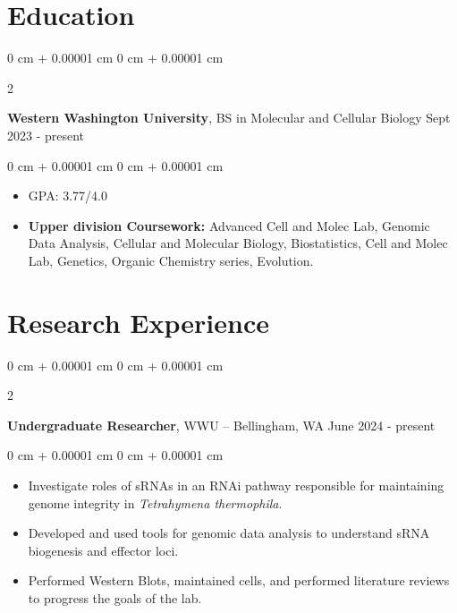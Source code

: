 \documentclass[10pt, letterpaper]{article}
\newenvironment{highlights}{
    \begin{itemize}[
        topsep=0.10 cm,
        parsep=0.10 cm,
        partopsep=0pt,
        itemsep=0pt,
        leftmargin=0 cm + 10pt
    ]
}{
    \end{itemize}
} %
\newenvironment{onecolentry}{
    \begin{adjustwidth}{
        0 cm + 0.00001 cm
    }{
        0 cm + 0.00001 cm
    }
}{
    \end{adjustwidth}
} %
\newenvironment{twocolentry}[2][]{
    \onecolentry
    \def\secondColumn{#2}
    \setcolumnwidth{\fill, 4.5 cm}
    \begin{paracol}{2}
}{
    \switchcolumn \raggedleft \secondColumn
    \end{paracol}
    \endonecolentry
} %
\begin{document}
    \section{Education}




        \begin{twocolentry}{
            Sept 2023 - present
        }
            \textbf{Western Washington University}, BS in Molecular and Cellular Biology \end{twocolentry}

        \vspace{0.10 cm}
        \begin{onecolentry}
            \begin{highlights}
                \item GPA: 3.77/4.0 %
                \item \textbf{Upper division Coursework:} Advanced Cell and Molec Lab, Genomic Data Analysis, Cellular and Molecular Biology, Biostatistics, Cell and Molec Lab, Genetics, Organic Chemistry series, Evolution.
            \end{highlights}
        \end{onecolentry}




    \section{Research Experience}




        \begin{twocolentry}{
            June 2024 - present
        }
            \textbf{Undergraduate Researcher}, WWU -- Bellingham, WA\end{twocolentry}

        \vspace{0.10 cm}
        \begin{onecolentry}
            \begin{highlights}
            \item Investigate roles of sRNAs in an RNAi pathway responsible for maintaining genome integrity in \textit{Tetrahymena thermophila}.
                \item Developed and used tools for genomic data analysis to understand sRNA biogenesis and effector loci.
                \item Performed Western Blots, maintained cells, and performed literature reviews to progress the goals of the lab.
            \end{highlights}
        \end{onecolentry}
\end{document}
